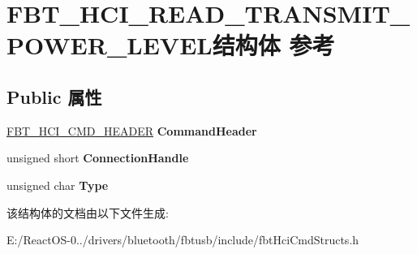 \hypertarget{struct_f_b_t___h_c_i___r_e_a_d___t_r_a_n_s_m_i_t___p_o_w_e_r___l_e_v_e_l}{}\section{F\+B\+T\+\_\+\+H\+C\+I\+\_\+\+R\+E\+A\+D\+\_\+\+T\+R\+A\+N\+S\+M\+I\+T\+\_\+\+P\+O\+W\+E\+R\+\_\+\+L\+E\+V\+E\+L结构体 参考}
\label{struct_f_b_t___h_c_i___r_e_a_d___t_r_a_n_s_m_i_t___p_o_w_e_r___l_e_v_e_l}
\subsection*{Public 属性}
\begin{DoxyCompactItemize}
\item 
\mbox{\label{struct_f_b_t___h_c_i___r_e_a_d___t_r_a_n_s_m_i_t___p_o_w_e_r___l_e_v_e_l_aac4db532e1800f604686ab6d0d35b748}} 
\hyperlink{struct_f_b_t___h_c_i___c_m_d___h_e_a_d_e_r}{F\+B\+T\+\_\+\+H\+C\+I\+\_\+\+C\+M\+D\+\_\+\+H\+E\+A\+D\+ER} {\bfseries Command\+Header}
\item 
\mbox{\label{struct_f_b_t___h_c_i___r_e_a_d___t_r_a_n_s_m_i_t___p_o_w_e_r___l_e_v_e_l_ab30457046066c30da567e4403f262609}} 
unsigned short {\bfseries Connection\+Handle}
\item 
\mbox{\label{struct_f_b_t___h_c_i___r_e_a_d___t_r_a_n_s_m_i_t___p_o_w_e_r___l_e_v_e_l_a9b478a1d94292f9b0d450eee0b5ec0f4}} 
unsigned char {\bfseries Type}
\end{DoxyCompactItemize}


该结构体的文档由以下文件生成\+:\begin{DoxyCompactItemize}
\item 
E\+:/\+React\+O\+S-\/0../drivers/bluetooth/fbtusb/include/fbt\+Hci\+Cmd\+Structs.\+h\end{DoxyCompactItemize}
